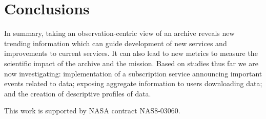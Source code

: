 \section{Conclusions}
In summary, taking an observation-centric view of an archive reveals new trending information which can guide development of new services and improvements to current services.  It can also lead to new metrics to measure the scientific impact of the archive and the mission.  Based on studies thus far we are now investigating: implementation of a subscription service announcing important events related to data; exposing aggregate information to users downloading data; and the creation of descriptive profiles of data.

\acknowledgements 
This work is supported by NASA contract NAS8-03060.
